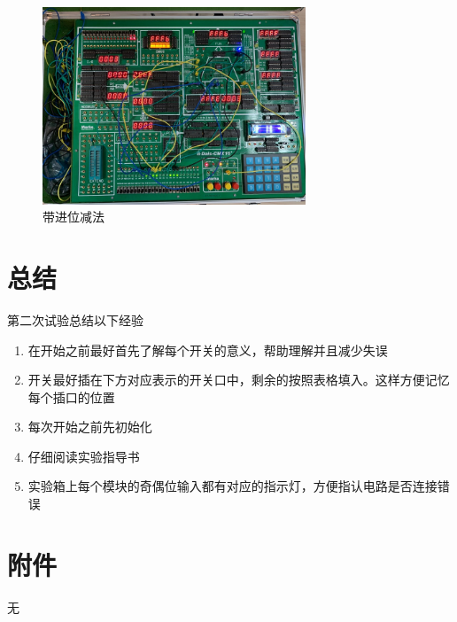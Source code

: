 \documentclass[a4paper,10pt,UTF8]{paper}
\numberwithin{equation}{section}
\numberwithin{figure}{section}
\begin{document}
\begin{figure}[h]
  \centering
  \includegraphics[width=0.7\textwidth]{sub.jpg}
  \caption{带进位减法}
  \label{fig:sub}
\end{figure}


\section{总结}

第二次试验总结以下经验

\begin{enumerate}
  \item 在开始之前最好首先了解每个开关的意义，帮助理解并且减少失误
  \item 开关最好插在下方对应表示的开关口中，剩余的按照表格填入。这样方便记忆每个插口的位置
  \item 每次开始之前先初始化
  \item 仔细阅读实验指导书
  \item 实验箱上每个模块的奇偶位输入都有对应的指示灯，方便指认电路是否连接错误
\end{enumerate}{}

\section{附件}

无
\end{document}
